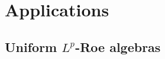 \documentclass[pdflatex,sn-mathphys-num]{sn-jnl}%
\theoremstyle{plain}
\theoremstyle{remark}
\theoremstyle{definition}
\numberwithin{equation}{section}
\begin{document}
\section{Applications}

\subsection{\texorpdfstring{Uniform \( L^p \)-Roe algebras}{Uniform Lp-Roe algebras}}

\end{document}
